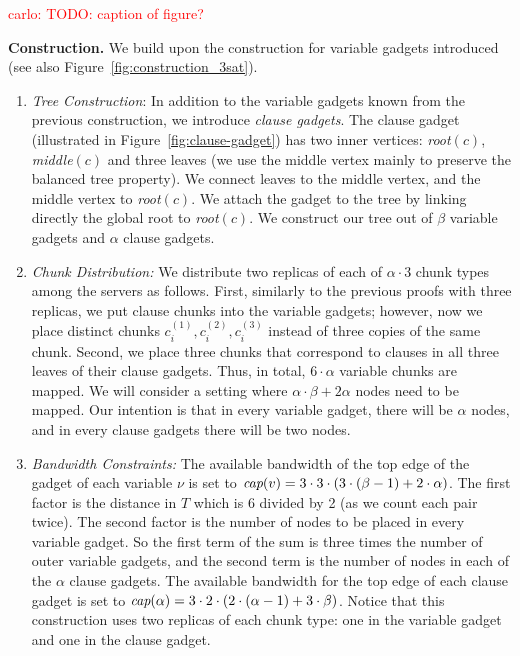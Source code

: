 \documentclass[9pt]{sigcomm-alternate}
\newcommand{\carlo}[1]{\textcolor{red}{carlo: #1}}
\newcommand{\variab}{\nu}
\newcommand{\clauses}{\alpha}
\newcommand{\vars}{\beta}
\newcommand{\capa}{\emph{cap}}
\newcommand{\Tree}{\ensuremath{T}}
\begin{document}
\begin{appendix}
\carlo{TODO: caption of figure?}

\textbf{Construction.}
We build upon the construction for variable gadgets introduced (see also Figure~\ref{fig:construction_3sat}).

\begin{enumerate}
  \item \emph{Tree Construction}: In addition to the variable gadgets known from the
  previous construction, we introduce \emph{clause
    gadgets}. The clause gadget (illustrated in Figure~\ref{fig:clause-gadget})
    has two inner vertices:
    \emph{root}$(c)$, \emph{middle}$(c)$ and three leaves (we use the middle vertex mainly to
    preserve the balanced tree property). We connect leaves to the
    middle vertex, and the middle vertex to \emph{root}$(c)$. We attach the
    gadget to the tree by linking directly the global root to
    \emph{root}$(c)$. We construct our tree out of $\vars$ variable gadgets
    and $\clauses$ clause gadgets.
  \item \emph{Chunk Distribution:}
    We distribute two replicas of each of $\clauses \cdot 3$ chunk types among the servers as follows.
    First, similarly to the
previous proofs with three replicas, we put clause chunks into the variable
gadgets; however, now we place distinct chunks $c^{(1)}_i, c^{(2)}_i, c^{(3)}_i$
instead of three copies of the same chunk. Second, we place three
chunks that correspond to clauses in all three leaves of their clause
gadgets.  Thus, in total, $6 \cdot \clauses$ variable chunks are
mapped.  We will consider a setting where $\clauses \cdot \vars +
2\clauses$ nodes need to be mapped. Our intention is that in every
variable gadget, there will be $\clauses$ nodes, and in every clause
gadgets there will be two nodes.

  \item \emph{Bandwidth Constraints:}
    The available bandwidth of the top edge of the gadget of each variable $\variab$ is set to
$\capa(v) = 3  \cdot  3  \cdot  (3  \cdot  (\vars - 1) + 2  \cdot  \clauses)$.
The first factor is the distance in $\Tree$ which is 6 divided by 2 (as
we count each pair twice). The second factor is
the number of nodes to be placed in every variable gadget.
So the first term of the
sum is three times the number of outer variable gadgets,
and the second term is the
number of nodes in each of the $\clauses$ clause gadgets.
The available bandwidth for the top edge of each clause gadget is set to
$\capa(\clauses) = 3  \cdot  2  \cdot  (2  \cdot  (\clauses - 1) + 3  \cdot  \vars) $.
Notice that this construction uses two replicas of each chunk type:
one in the variable gadget and one in the clause gadget.


\end{enumerate}
\end{appendix}
\end{document}
